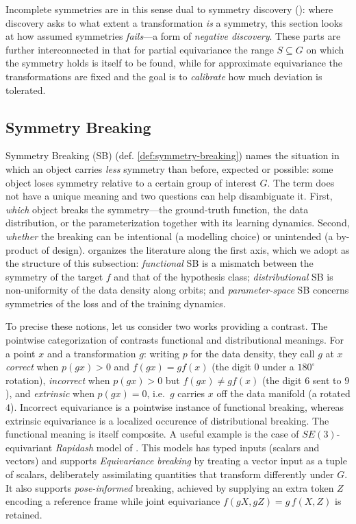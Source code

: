 \documentclass[mathematics,review,submit,moreauthors]{Definitions/mdpi}
\begin{document}
Incomplete symmetries are in this sense dual to symmetry discovery (): where discovery asks to what extent a transformation \emph{is} a symmetry, this section looks at how assumed symmetries \emph{fails}---a form of \emph{negative discovery}.
These parts are further interconnected in that for partial equivariance the range $S\subseteq G$ on which the symmetry holds is itself to be found, while for approximate equivariance the transformations are fixed and the goal is to \emph{calibrate} how much deviation is tolerated.


\subsection{Symmetry Breaking}\label{sec:symmetry-breaking-dl}

Symmetry Breaking (SB) (def. \ref{def:symmetry-breaking}) names the situation in which an object carries \emph{less} symmetry than before, expected or possible: some object loses symmetry relative to a certain group of interest $G$.
The term does not have a unique meaning and two questions can help disambiguate it.
First, \emph{which} object breaks the symmetry---the ground-truth function, the data distribution, or the parameterization together with its learning dynamics.
Second, \emph{whether} the breaking can be intentional (a modelling choice) or unintended (a by-product of design).
 organizes the literature along the first axis, which we adopt as the structure of this subsection: \emph{functional} SB is a mismatch between the symmetry of the target $f$ and that of the hypothesis class; \emph{distributional} SB is non-uniformity of the data density along orbits; and \emph{parameter-space} SB concerns symmetries of the loss and of the training dynamics.

To precise these notions, let us consider two works providing a contrast.
The pointwise categorization of \citet{wang2023a} contrasts functional and distributional meanings.
For a point $x$ and a transformation $g$: writing $p$ for the data density, they call $g$ at $x$ \emph{correct} when $p(gx)>0$ and $f(gx)=gf(x)$ (the digit $0$ under a $180^\circ$ rotation), \emph{incorrect} when $p(gx)>0$ but $f(gx)\neq gf(x)$ (the digit $6$ sent to $9$), and \emph{extrinsic} when $p(gx)=0$, i.e.\ $g$ carries $x$ off the data manifold (a rotated $4$).
Incorrect equivariance is a pointwise instance of functional breaking, whereas extrinsic equivariance is a localized occurence of distributional breaking.
The functional meaning is itself composite.
A useful example is the case of $SE(3)$-equivariant \emph{Rapidash} model of \citet{vadgama2025}.
This models has typed inputs (scalars and vectors) and supports \emph{Equivariance breaking} by treating a vector input as a tuple of scalars, deliberately assimilating quantities that transform differently under $G$.
It also supports \emph{pose-informed} breaking, achieved by supplying an extra token $Z$ encoding a reference frame while joint equivariance $f(gX,gZ)=g\,f(X,Z)$ is retained.
\end{document}

